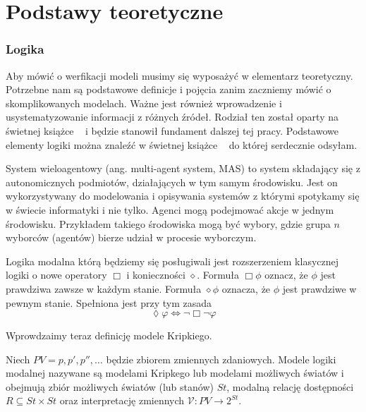 
\chapter{Podstawy teoretyczne}
\subsection{Logika}
Aby mówić o werfikacji modeli musimy się wyposażyć w  elementarz teoretyczny. Potrzebne nam są podstawowe 
definicje i pojęcia zanim zaczniemy mówić o skomplikowanych modelach. Ważne jest również 
wprowadzenie i usystematyzowanie informacji z różnych źródeł. Rodział ten został oparty 
na świetnej książce ~\cite{Jamroga} i będzie stanowił fundament dalszej tej pracy.
Podstawowe elementy logiki można znaleźć w świetnej książce ~\cite[Podstawy Logiki]{batog1994podstawy} do której serdecznie
odsyłam.

 System wieloagentowy (ang. multi-agent system, MAS) to system składający się z autonomicznych podmiotów, działających 
 w tym samym środowisku. Jest on wykorzystywany do modelowania i opisywania systemów z którymi 
 spotykamy się w świecie informatyki i nie tylko. Agenci mogą podejmować akcje w jednym 
środowisku. Przykładem takiego środowiska mogą być wybory, gdzie grupa $n$ wyborców 
(agentów) bierze udział w procesie wyborczym.

Logika modalna którą będziemy się posługiwali jest rozszerzeniem klasycznej logiki 
o nowe operatory $\Box$ i konieczności $\diamond$. Formuła $\Box \phi$ oznacz, że $\phi$ 
jest prawdziwa zawsze w każdym stanie. Formuła $\diamond \phi$ oznacza, że $\phi$ jest prawdziwe 
w pewnym stanie. Spełniona jest przy tym zasada 
\begin{equation*}
    \lozenge \varphi \iff \neg \Box \neg \varphi
\end{equation*}

Wprowdzaimy teraz definicję modele Kripkiego.
\begin{definition}
    Niech \( PV = p, p', p'', \ldots \) będzie zbiorem zmiennych 
    zdaniowych. Modele logiki modalnej nazywane są modelami Kripkego lub modelami możliwych 
    światów i obejmują zbiór możliwych światów (lub stanów) \( St \),
     modalną relację dostępności \( R \subseteq St \times St \) oraz interpretację 
     zmiennych \( \mathcal{V} : PV \rightarrow 2^{St} \).
\end{definition}

